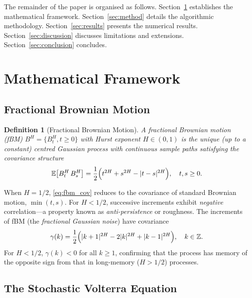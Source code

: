 \documentclass[conference]{IEEEtran}
\newtheorem{definition}{Definition}
\newcommand{\E}{\mathbb{E}}
\newcommand{\abs}[1]{\lvert #1 \rvert}
\begin{document}
The remainder of the paper is organised as follows.
Section~\ref{sec:math} establishes the mathematical framework.
Section~\ref{sec:method} details the algorithmic methodology.
Section~\ref{sec:results} presents the numerical results.
Section~\ref{sec:discussion} discusses limitations and extensions.
Section~\ref{sec:conclusion} concludes.

\section{Mathematical Framework}\label{sec:math}

\subsection{Fractional Brownian Motion}

\begin{definition}[Fractional Brownian Motion]
A fractional Brownian motion (fBM) $B^H = \{B^H_t, t \geq 0\}$ with
Hurst exponent $H \in (0,1)$ is the unique (up to a constant) centred
Gaussian process with continuous sample paths satisfying the covariance
structure
\begin{equation}\label{eq:fbm_cov}
  \E\bigl[B^H_t\, B^H_s\bigr]
  = \frac{1}{2}\Bigl(t^{2H} + s^{2H} - \abs{t-s}^{2H}\Bigr),
  \quad t,s \geq 0.
\end{equation}
\end{definition}

When $H = 1/2$, \eqref{eq:fbm_cov} reduces to the covariance of
standard Brownian motion, $\min(t,s)$.  For $H < 1/2$, successive
increments exhibit \emph{negative} correlation—a property known as
\emph{anti-persistence} or roughness.  The increments of fBM (the
\emph{fractional Gaussian noise}) have covariance
\begin{equation}\label{eq:fgn_cov}
  \gamma(k) = \frac{1}{2}\Bigl(\abs{k+1}^{2H} - 2\abs{k}^{2H}
              + \abs{k-1}^{2H}\Bigr), \quad k \in \mathbb{Z}.
\end{equation}
For $H < 1/2$, $\gamma(k) < 0$ for all $k \geq 1$, confirming that
the process has memory of the opposite sign from that in long-memory
($H > 1/2$) processes.

\subsection{The Stochastic Volterra Equation}
\end{document}
